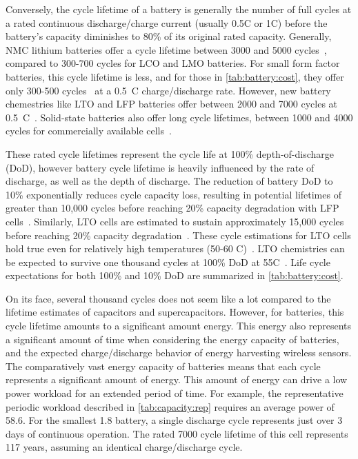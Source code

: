 Conversely, the cycle lifetime of a battery is generally the number of full cycles at a rated continuous discharge/charge current (usually 0.5C or 1C) before the battery's capacity diminishes to 80\% of its original rated capacity.
Generally, NMC lithium batteries offer a cycle lifetime between 3000 and 5000 cycles~\cite{richter2017measurements,preger2020degradation}, compared to 300-700 cycles for LCO and LMO batteries.
For small form factor batteries, this cycle lifetime is less, and for those in \cref{tab:battery:cost}, they offer only 300-500 cycles~\cite{lipoDatasheet, millibatNimbus} at a 0.5~C charge/discharge rate.
However, new battery chemestries like LTO and LFP batteries offer between 2000 and 7000 cycles at 0.5~C~\cite{hallExperimental18, LTODatasheet, LTODatasheet2,omarLithium14, sarasketaCycle15, wangCycle11,lifepo4Datasheet, preger2020degradation}. Solid-state batteries also offer long cycle lifetimes, between 1000 and 4000 cycles for commercially available cells~\cite{stEnfilm,tdkCeraCharge}.

These rated cycle lifetimes represent the cycle life at 100\% depth-of-discharge (DoD), however battery cycle lifetime is heavily influenced by the rate of discharge, as well as the depth of discharge.
The reduction of battery DoD to 10\%
exponentially reduces cycle capacity loss, resulting in potential
lifetimes of greater than 10,000 cycles before reaching 20\% capacity degradation with LFP cells~\cite{omarLithium14, wangCycle11}. Similarly, LTO cells are estimated to sustain approximately 15,000 cycles before reaching 20\% capacity degradation~\cite{stroe2018accelerated}.
These cycle estimations for LTO cells hold true even for relatively high temperatures (50-60\textdegree
C)~\cite{wangCycle11, stroe2018accelerated}.
LTO chemistries can be expected to survive one thousand
cycles at 100\% DoD at 55\textdegree C~\cite{han2014cycle}.
Life cycle
expectations for both 100\% and 10\% DoD are summarized in
\cref{tab:battery:cost}.

On its face, several thousand cycles does not seem like a lot compared to the lifetime estimates of capacitors and supercapacitors. However, for batteries, this cycle lifetime amounts to a significant amount energy. This energy also represents a significant amount of time when considering the energy capacity of batteries, and the expected charge/discharge behavior of energy harvesting wireless sensors.
The comparatively vast energy capacity of batteries means that each cycle represents a significant amount of energy. This amount of energy can drive a low power workload for an extended period of time. For example, the representative periodic workload described in \cref{tab:capacity:rep} requires an average power of 58.6\ssi{\micro\watt}. For the smallest 1.8\ssi{\milli\Ah} battery, a single discharge cycle represents just over 3 days of continuous operation. The rated 7000 cycle lifetime of this cell represents 117 years, assuming an identical charge/discharge cycle. 

